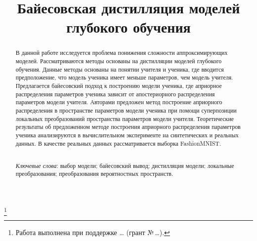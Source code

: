 \documentclass[12pt]{a&t}
\begin{document}


\title{Байесовская дистилляция моделей глубокого обучения}%
\thanks{Работа выполнена при поддержке \dots
(грант \mbox{№\,\dots}).}


\maketitle

\begin{abstract}
В данной работе исследуется проблема понижения сложности аппроксимирующих моделей. Рассматриваются методы основаны на дистилляции моделей глубокого обучения. Данные методы основаны на понятии учителя и ученика, где вводится предположение, что модель ученика имеет меньше параметров, чем модель учителя. Предлагается байесовский подход к построению модели ученика, где априорное распределения параметров ученика зависит от апостериорного распределения параметров модели учителя. Авторами предложен метод построение априорного распределения в пространстве параметров модели ученика при помощи суперпозиции локальных преобразований пространства параметров модели учителя. Теоретические результаты об предложенном методе построения априорного распределения параметров ученика анализируются в вычислительном эксперименте на синтетических и реальных данных. В качестве реальных данных рассматривается выборка FashionMNIST.

\smallskip\\
\textit{Ключевые слова}: выбор модели; байесовский вывод; дистилляция модели; локальные преобразования; преобразования вероятностных пространств.
\end{abstract}
\end{document}
